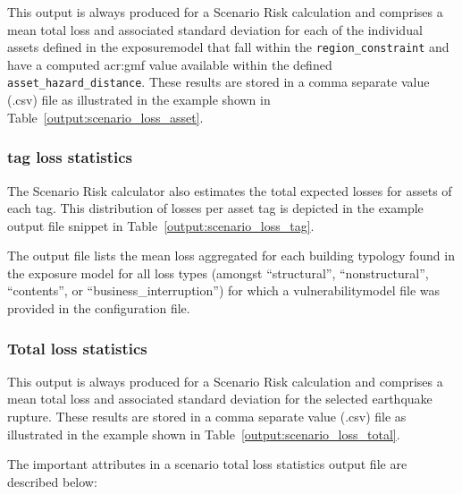 This output is always produced for a Scenario Risk calculation and comprises a
mean total loss and associated standard deviation for each of the individual
\glspl{asset} defined in the \gls{exposuremodel} that fall within the
\Verb+region_constraint+ and have a computed \gls{acr:gmf} value available
within the defined \Verb+asset_hazard_distance+. These results are stored in a
comma separate value (.csv) file as illustrated in the example shown in
Table~\ref{output:scenario_loss_asset}.




\subsubsection{tag loss statistics}
\label{subsubsec:scenario_tag_loss_statistics}

The Scenario Risk calculator also estimates the total expected losses for
assets of each \gls{tag}. This distribution of losses per asset
\gls{tag} is depicted in the example output file snippet in
Table~\ref{output:scenario_loss_tag}.



The output file lists the mean loss aggregated for each building typology
found in the exposure model for all loss types (amongst ``structural'',
``nonstructural'', ``contents'', or ``business\_interruption'') for which a
\gls{vulnerabilitymodel} file was provided in the configuration file.


\subsubsection{Total loss statistics}
\label{subsubsec:scenario_total_loss_statistics}

This output is always produced for a Scenario Risk calculation and comprises a
mean total loss and associated standard deviation for the selected earthquake
rupture. These results are stored in a comma separate value (.csv) file as
illustrated in the example shown in Table~\ref{output:scenario_loss_total}.



The important attributes in a scenario total loss statistics output file are
described below:


